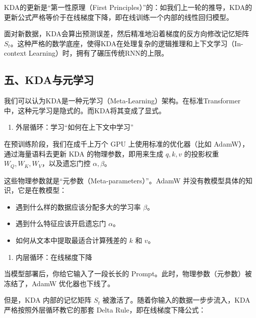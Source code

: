 KDA的更新是``第一性原理（First Principles）''的：如我们上一轮的推导，KDA的更新公式严格等价于在线梯度下降，即在线训练一个内部的线性回归模型。

面对新数据，KDA会算出预测误差，然后精准地沿着梯度的反方向修改记忆矩阵 \(S_t\)。这种严格的数学底座，使得KDA在处理复杂的逻辑推理和上下文学习（In-context Learning）时，拥有了碾压传统RNN的上限。

\hypertarget{ux4e94kdaux4e0eux5143ux5b66ux4e60}{%
\subsection{五、KDA与元学习}\label{ux4e94kdaux4e0eux5143ux5b66ux4e60}}

我们可以认为KDA是一种元学习（Meta-Learning）架构。在标准Transformer中，这种元学习是隐式的。而KDA将其变成了显式。

\begin{enumerate}
\def\labelenumi{\arabic{enumi}.}
\tightlist
\item
  外层循环：学习``如何在上下文中学习''
\end{enumerate}

在预训练阶段，我们在成千上万个 GPU 上使用标准的优化器（比如 AdamW），通过海量语料去更新 KDA 的物理参数，即用来生成 \(q,k,v\) 的投影权重 \(W_Q,W_K,W_V\)，以及遗忘门控 \(\alpha,\beta\)。

这些物理参数就是``元参数（Meta-parameters）''。AdamW 并没有教模型具体的知识，它是在教模型：

\begin{itemize}
\tightlist
\item
  遇到什么样的数据应该分配多大的学习率 \(\beta\)。
\item
  遇到什么特征应该开启遗忘门 \(\alpha\)。
\item
  如何从文本中提取最适合计算残差的 \(k\) 和 \(v\)。
\end{itemize}

\begin{enumerate}
\def\labelenumi{\arabic{enumi}.}
\setcounter{enumi}{1}
\tightlist
\item
  内层循环：在线梯度下降
\end{enumerate}

当模型部署后，你给它输入了一段长长的 Prompt。此时，物理参数（元参数）被冻结了，AdamW 优化器也下线了。

但是，KDA 内部的记忆矩阵 \(S_t\) 被激活了。随着你输入的数据一步步流入，KDA 严格按照外层循环教它的那套 Delta Rule，即在线梯度下降公式：

